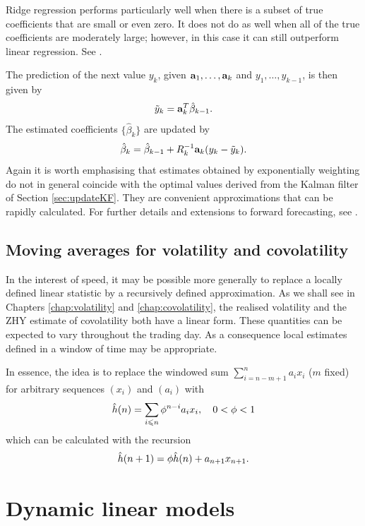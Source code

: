 Ridge regression performs particularly well when there is a subset of true coefficients that are small or even zero. It does not do as well when all of the true coefficients are moderately large; however, in this case it can still outperform linear regression. See \citet{trevor2001elements}.

The prediction of the next value $y_k$, given $\mathbf{a}_1,\dots,\mathbf{a}_k$ and $y_1,\dots,y_{k-1}$, is then given by
$$\tilde{y}_{k} = \mathbf{a}^T_k \hat{\beta}_{k-1}.$$
The estimated coefficients $\{\hat{\beta}_k\}$ are updated by
$$
\hat{\beta}_k = \hat{\beta}_{k-1}  + R^{-1}_k \mathbf{a}_k (y_k - \tilde{y}_{k}). 
$$
Again it is worth emphasising that  estimates obtained by exponentially weighting do not in general coincide with the optimal values derived from the Kalman filter of Section \ref{sec:updateKF}. They are convenient approximations that can be rapidly calculated. For further details and extensions to forward forecasting, see \citet{brown2004smoothing}.


\subsection{Moving averages for volatility and covolatility}\label{sec:MAvolcovol}
In the interest of speed, it may be possible more generally to replace a locally defined linear statistic by a recursively defined approximation. As we shall see in Chapters \ref{chap:volatility} and \ref{chap:covolatility}, the realised volatility and the ZHY estimate of covolatility both have a linear form. These quantities can be expected to vary throughout the trading day. As a consequence local estimates defined in a window of time may be appropriate. 

In essence, the idea is to replace the windowed sum  $\sum_{i=n-m+1}^n a_i x_i$ ($m$ fixed)  for arbitrary sequences $(x_i)$ and $(a_i)$ with
$$\hat{h}(n) =  \sum_{i\leqslant n}  \phi^{n-i}  a_i x_i, \quad 0< \phi < 1$$
which can be calculated with the recursion 
\begin{equation}\label{eq:recursevolcovol}\hat{h}(n+1) = \phi \hat{h}(n) + a_{n+1} x_{n+1}.\end{equation}   
 
\section{Dynamic linear models}\label{sec:dynamicLM}

